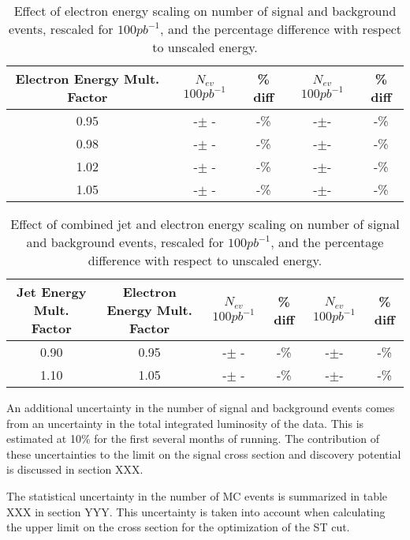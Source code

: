 \documentclass{cmspaper}
\begin{document}
\begin{table}[htbp]
\begin{center}
\begin{tabular}{|c|c|c|c|c|}
\hline
\hline
Electron Energy Mult. Factor & $N_{ev}$ $100pb^{-1}$ & \% diff & $N_{ev}$ $100pb^{-1}$ & \% diff  \\
\hline
\hline
0.95 & -$\pm$ -& -\% &-$\pm$-& -\% \\
\hline
0.98 & -$\pm$ -& -\% &-$\pm$-& -\% \\
\hline
1.02 & -$\pm$ -& -\% &-$\pm$-&-\% \\
\hline
1.05 & -$\pm$ -& -\% &-$\pm$-& -\% \\
\hline

\hline
\end{tabular}
\end{center}
\caption{Effect of electron energy scaling on number of signal and background events, rescaled for $100 pb^{-1}$, and the percentage difference with respect to unscaled energy.}
\label{tab:ElecUncertainty}
\end{table}

\begin{table}[htbp]
\begin{center}
\begin{tabular}{|c|c|c|c|c|c|}
\hline
\hline
Jet Energy Mult. Factor & Electron Energy Mult. Factor & $N_{ev}$ $100pb^{-1}$ & \% diff & $N_{ev}$ $100pb^{-1}$ & \% diff  \\
\hline
\hline
0.90 & 0.95 & -$\pm$ -& -\% &-$\pm$-& -\% \\
\hline
1.10 & 1.05 & -$\pm$ -& -\% &-$\pm$-& -\% \\
\hline

\hline
\end{tabular}
\end{center}
\caption{Effect of combined jet and electron energy scaling on number of signal and background events, rescaled for $100 pb^{-1}$, and the percentage difference with respect to unscaled energy.}
\label{tab:JetElecUncertainty}
\end{table}


An additional uncertainty in the number of signal and background events comes from an uncertainty in the total integrated luminosity of the data.  
This is estimated at 10\% for the first several months of running.
The contribution of these uncertainties to the limit on the signal cross section and discovery potential is discussed in section XXX.

The statistical uncertainty in the number of MC events is summarized in table XXX in section YYY.  This uncertainty is taken into account when calculating the upper 
limit on the cross section for the optimization of the ST cut.
\end{document}
